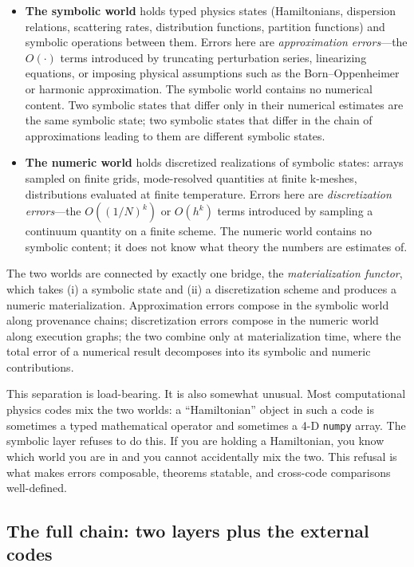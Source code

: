 \documentclass[11pt,a4paper]{article}
\newcommand{\abstr}[1]{\textcolor{abstrcol}{#1}}
\newcommand{\numr}[1]{\textcolor{numcol}{#1}}
\begin{document}
\begin{itemize}[leftmargin=2em]
  \item \abstr{\textbf{The symbolic world}} holds typed physics states (Hamiltonians, dispersion
        relations, scattering rates, distribution functions, partition functions) and symbolic
        operations between them. Errors here are \emph{approximation errors}---the $O(\cdot)$
        terms introduced by truncating perturbation series, linearizing equations, or imposing
        physical assumptions such as the Born--Oppenheimer or harmonic approximation. The
        symbolic world contains no numerical content. Two symbolic states that differ only in
        their numerical estimates are the same symbolic state; two symbolic states that differ
        in the chain of approximations leading to them are different symbolic states.
  \item \numr{\textbf{The numeric world}} holds discretized realizations of symbolic states:
        arrays sampled on finite grids, mode-resolved quantities at finite k-meshes,
        distributions evaluated at finite temperature. Errors here are \emph{discretization
        errors}---the $O((1/N)^k)$ or $O(h^k)$ terms introduced by sampling a continuum quantity
        on a finite scheme. The numeric world contains no symbolic content; it does not know
        what theory the numbers are estimates of.
\end{itemize}

The two worlds are connected by exactly one bridge, the \emph{materialization functor}, which
takes (i) a symbolic state and (ii) a discretization scheme and produces a numeric
materialization. Approximation errors compose in the symbolic world along provenance chains;
discretization errors compose in the numeric world along execution graphs; the two combine only
at materialization time, where the total error of a numerical result decomposes into its symbolic
and numeric contributions.

This separation is load-bearing. It is also somewhat unusual. Most computational physics codes
mix the two worlds: a ``Hamiltonian'' object in such a code is sometimes a typed mathematical
operator and sometimes a 4-D \texttt{numpy} array. The symbolic layer refuses to do this. If you are
holding a Hamiltonian, you know which world you are in and you cannot
accidentally mix the two. This refusal is what makes errors composable, theorems statable, and
cross-code comparisons well-defined.

\subsection{The full chain: two layers plus the external codes}
\label{ssec:two-layer-chain}
\end{document}
